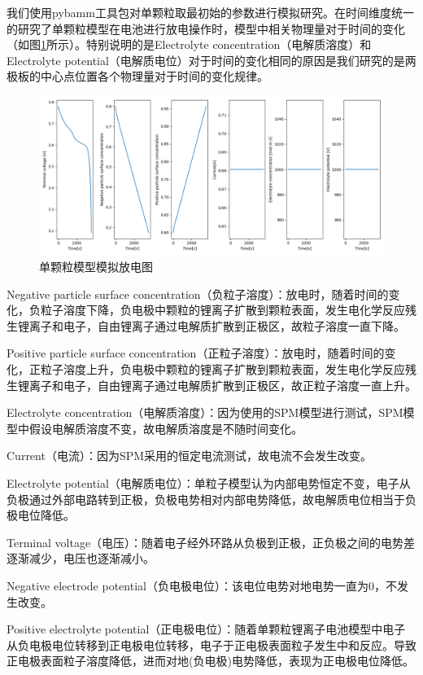 \documentclass[12pt]{ctexart}%
\begin{document}
我们使用pybamm工具包\cite{Sulzer2021}对单颗粒取最初始的参数进行模拟研究。在时间维度统一的研究了单颗粒模型在电池进行放电操作时，模型中相关物理量对于时间的变化（如图\ref{c}所示）。特别说明的是Electrolyte concentration（电解质溶度）和Electrolyte potential（电解质电位）对于时间的变化相同的原因是我们研究的是两极板的中心点位置各个物理量对于时间的变化规律。
\begin{figure}[h]
	\centering
	\includegraphics[scale = 0.4]{SPM}
	\caption{单颗粒模型模拟放电图}
	\label{c}
\end{figure}

Negative particle surface concentration（负粒子溶度）：放电时，随着时间的变化，负粒子溶度下降，负电极中颗粒的锂离子扩散到颗粒表面，发生电化学反应残生锂离子和电子，自由锂离子通过电解质扩散到正极区，故粒子溶度一直下降。

Positive particle surface concentration（正粒子溶度）：放电时，随着时间的变化，正粒子溶度上升，负电极中颗粒的锂离子扩散到颗粒表面，发生电化学反应残生锂离子和电子，自由锂离子通过电解质扩散到正极区，故正粒子溶度一直上升。

Electrolyte concentration（电解质溶度）：因为使用的SPM模型进行测试，SPM模型中假设电解质溶度不变，故电解质溶度是不随时间变化。

Current（电流）：因为SPM采用的恒定电流测试，故电流不会发生改变。

Electrolyte potential（电解质电位）：单粒子模型认为内部电势恒定不变，电子从负极通过外部电路转到正极，负极电势相对内部电势降低，故电解质电位相当于负极电位降低。

Terminal voltage（电压）：随着电子经外环路从负极到正极，正负极之间的电势差逐渐减少，电压也逐渐减小。

Negative electrode potential（负电极电位）：该电位电势对地电势一直为0，不发生改变。

Positive electrolyte potential（正电极电位）：随着单颗粒锂离子电池模型中电子从负电极电位转移到正电极电位转移，电子于正电极表面粒子发生中和反应。导致正电极表面粒子溶度降低，进而对地(负电极)电势降低，表现为正电极电位降低。
\end{document}
